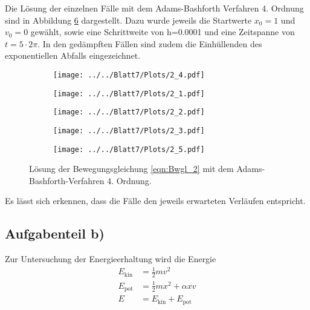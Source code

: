 Die Lösung der einzelnen Fälle mit dem Adams-Bashforth Verfahren 4. Ordnung  sind in Abbildung \ref{fig:2} dargestellt. Dazu wurde jeweils die Startwerte $x_0=1$ und $v_0=0$ gewählt, sowie eine Schrittweite von h=0.0001
und eine Zeitspanne von $t=5\cdot 2\pi$. In den gedämpften Fällen sind zudem die Einhüllenden des exponentiellen  Abfalls eingezeichnet.
\begin{figure}[H]
\begin{subfigure}[c]{0.5\textwidth}
\texttt{[image: ../../Blatt7/Plots/2\_4.pdf]}
\label{fig:2_1}
\end{subfigure}
\begin{subfigure}[c]{0.5\textwidth}
\texttt{[image: ../../Blatt7/Plots/2\_1.pdf]}
\label{fig:2_2}
\end{subfigure}
\begin{subfigure}[c]{0.5\textwidth}
\texttt{[image: ../../Blatt7/Plots/2\_2.pdf]}
\label{fig:2_3}
\end{subfigure}
\begin{subfigure}[c]{0.5\textwidth}
\texttt{[image: ../../Blatt7/Plots/2\_3.pdf]}
\label{fig:2_4}
\end{subfigure}
\begin{subfigure}[c]{0.5\textwidth}
\texttt{[image: ../../Blatt7/Plots/2\_5.pdf]}
\label{fig:2_5}
\end{subfigure}
\caption{Lösung der Bewegungsgleichung \eqref{eqn:Bwgl_2} mit dem Adams-Bashforth-Verfahren 4. Ordnung.}
\label{fig:2}
\end{figure}

Es lässt sich erkennen, dass die Fälle den jeweils erwarteten Verläufen entspricht.

\subsection*{Aufgabenteil b)}

Zur Untersuchung der Energieerhaltung wird die Energie
\begin{align}
  E_{\text{kin}}&=\frac{1}{2}mv^2 \\
  E_{\text{pot}}&=\frac{1}{2}mx^2+\alpha x v \\
  E&=E_{\text{kin}}+E_{\text{pot}}
\end{align}

